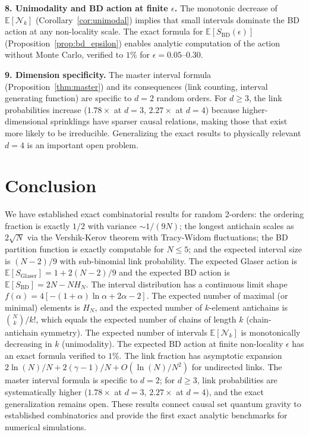 \documentclass[aps,prd,twocolumn,superscriptaddress,nofootinbib]{revtex4-2}
\begin{document}
\textbf{8. Unimodality and BD action at finite $\epsilon$.} The monotonic decrease of $\mathbb{E}[\mathcal{N}_k]$ (Corollary~\ref{cor:unimodal}) implies that small intervals dominate the BD action at any non-locality scale. The exact formula for $\mathbb{E}[S_{\mathrm{BD}}(\epsilon)]$ (Proposition~\ref{prop:bd_epsilon}) enables analytic computation of the action without Monte Carlo, verified to $1\%$ for $\epsilon = 0.05$--$0.30$.

\textbf{9. Dimension specificity.} The master interval formula (Proposition~\ref{thm:master}) and its consequences (link counting, interval generating function) are specific to $d = 2$ random orders. For $d \geq 3$, the link probabilities increase ($1.78\times$ at $d = 3$, $2.27\times$ at $d = 4$) because higher-dimensional sprinklings have sparser causal relations, making those that exist more likely to be irreducible. Generalizing the exact results to physically relevant $d = 4$ is an important open problem.

\section{Conclusion}

We have established exact combinatorial results for random 2-orders: the ordering fraction is exactly $1/2$ with variance $\sim 1/(9N)$; the longest antichain scales as $2\sqrt{N}$ via the Vershik-Kerov theorem with Tracy-Widom fluctuations; the BD partition function is exactly computable for $N \leq 5$; and the expected interval size is $(N-2)/9$ with sub-binomial link probability. The expected Glaser action is $\mathbb{E}[S_{\mathrm{Glaser}}] = 1 + 2(N-2)/9$ and the expected BD action is $\mathbb{E}[S_{\mathrm{BD}}] = 2N - N H_N$. The interval distribution has a continuous limit shape $f(\alpha) = 4[-(1+\alpha)\ln\alpha + 2\alpha - 2]$. The expected number of maximal (or minimal) elements is $H_N$, and the expected number of $k$-element antichains is $\binom{N}{k}/k!$, which equals the expected number of chains of length $k$ (chain-antichain symmetry). The expected number of intervals $\mathbb{E}[\mathcal{N}_k]$ is monotonically decreasing in $k$ (unimodality). The expected BD action at finite non-locality $\epsilon$ has an exact formula verified to $1\%$. The link fraction has asymptotic expansion $2\ln(N)/N + 2(\gamma-1)/N + O(\ln(N)/N^2)$ for undirected links. The master interval formula is specific to $d = 2$; for $d \geq 3$, link probabilities are systematically higher ($1.78\times$ at $d = 3$, $2.27\times$ at $d = 4$), and the exact generalization remains open. These results connect causal set quantum gravity to established combinatorics and provide the first exact analytic benchmarks for numerical simulations.
\end{document}
